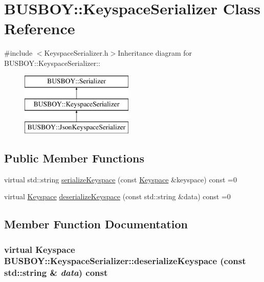 \hypertarget{classBUSBOY_1_1KeyspaceSerializer}{
\section{BUSBOY::KeyspaceSerializer Class Reference}
\label{classBUSBOY_1_1KeyspaceSerializer}
}


{\ttfamily \#include $<$KeyspaceSerializer.h$>$}Inheritance diagram for BUSBOY::KeyspaceSerializer::\begin{figure}[H]
\begin{center}
\leavevmode
\includegraphics[height=3cm]{classBUSBOY_1_1KeyspaceSerializer}
\end{center}
\end{figure}
\subsection*{Public Member Functions}
\begin{DoxyCompactItemize}
\item 
virtual std::string \hyperlink{classBUSBOY_1_1KeyspaceSerializer_a90e8c692601fcd75cd94ccc1c06b7deb}{serializeKeyspace} (const \hyperlink{classBUSBOY_1_1Keyspace}{Keyspace} \&keyspace) const =0
\item 
virtual \hyperlink{classBUSBOY_1_1Keyspace}{Keyspace} \hyperlink{classBUSBOY_1_1KeyspaceSerializer_a75f693a9b32f9b4b9f64d9087aeb7d9c}{deserializeKeyspace} (const std::string \&data) const =0
\end{DoxyCompactItemize}


\subsection{Member Function Documentation}
\hypertarget{classBUSBOY_1_1KeyspaceSerializer_a75f693a9b32f9b4b9f64d9087aeb7d9c}{
\subsubsection[{deserializeKeyspace}]{\setlength{\rightskip}{0pt plus 5cm}virtual {\bf Keyspace} BUSBOY::KeyspaceSerializer::deserializeKeyspace (const std::string \& {\em data}) const}}
\label{classBUSBOY_1_1KeyspaceSerializer_a75f693a9b32f9b4b9f64d9087aeb7d9c}


